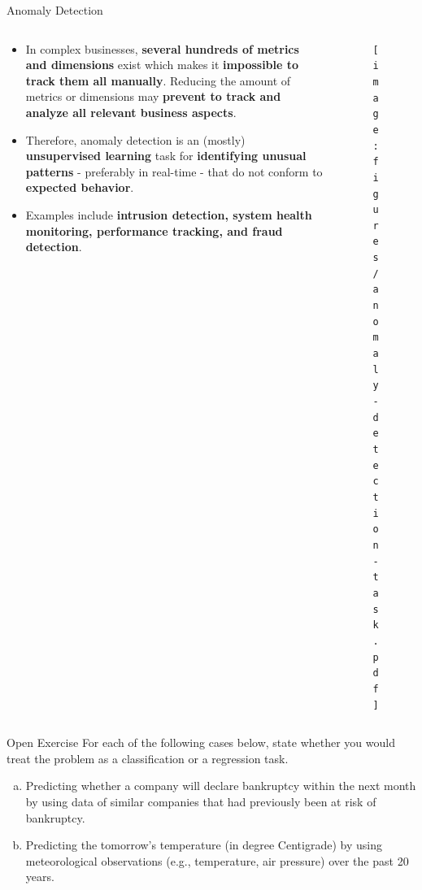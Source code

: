 \documentclass[main.tex]{subfiles}
\begin{document}
    \begin{frame}{Anomaly Detection}
        \begin{columns}
            \begin{column}{.6\textwidth}
                \begin{itemize}
                    \item In complex businesses, \textbf{several hundreds of metrics and dimensions} exist which makes it \textbf{impossible to track them all manually}. Reducing the amount of metrics or dimensions may \textbf{prevent to track and analyze all relevant business aspects}.
                    \item Therefore, anomaly detection is an (mostly) \textbf{unsupervised learning} task for \textbf{identifying unusual patterns} - preferably in real-time - that do not conform to \textbf{expected behavior}.
                    \item Examples include \textbf{intrusion detection, system health monitoring, performance tracking, and fraud detection}.
                \end{itemize}
            \end{column}
            \begin{column}{.4\textwidth}
                \begin{figure}
                    \label{fig:anomaly-detection-task}
                    \texttt{[image: figures/anomaly-detection-task.pdf]}
                \end{figure}
            \end{column}
        \end{columns}
    \end{frame}

    \begin{frame}{Open Exercise }
        For each of the following cases below, state whether you would treat the problem as a classification or a regression task.

        \begin{enumerate}[a)]
            \item Predicting whether a company will declare bankruptcy within the next month by using data of similar companies that had previously been at risk of bankruptcy.
            \item Predicting the tomorrow's temperature (in degree Centigrade) by using meteorological observations (e.g., temperature, air pressure) over the past 20 years.
        \end{enumerate}
    \end{frame}	
\end{document}
